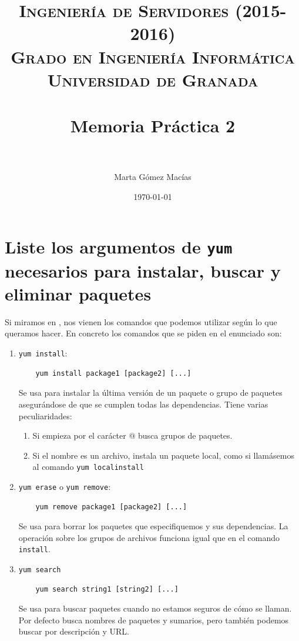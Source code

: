 \documentclass[10pt,a4paper,spanish]{article}
\title{
\normalfont \normalsize 
\textsc{{\bf Ingeniería de Servidores (2015-2016)} \\ Grado en Ingeniería Informática \\ Universidad de Granada} \\ [25pt] %
\horrule{0.5pt} \\[0.4cm] %
\huge Memoria Práctica 2 \\ %
\horrule{2pt} \\[0.5cm] %
}
\author{Marta Gómez Macías} %
\date{\normalsize\today} %
\numberwithin{equation}{section} %
\numberwithin{figure}{section} %
\numberwithin{table}{section} %
\begin{document}
\renewcommand{\listtablename}{Índice de tablas}
\renewcommand{\tablename}{Tabla} 

\maketitle %

\newpage %

\tableofcontents %

\listoffigures


\newpage

\section{Liste los argumentos de \texttt{yum} necesarios para instalar, buscar y eliminar paquetes}
Si miramos en \cite{manyum}, nos vienen los comandos que podemos utilizar según lo que queramos hacer. En concreto los comandos que se piden en el enunciado son:
\begin{enumerate}[---]
    \item \texttt{yum install}:
    \begin{verbatim}
    yum install package1 [package2] [...]
    \end{verbatim}

    Se usa para instalar la última versión de un paquete o grupo de paquetes asegurándose de que se cumplen todas las dependencias. Tiene varias peculiaridades:
    \begin{enumerate}[$\bullet$]
        \item Si empieza por el carácter $@$ busca grupos de paquetes.
        \item Si el nombre es un archivo, instala un paquete local, como si llamásemos al comando \texttt{yum localinstall}
    \end{enumerate}

    \item \texttt{yum erase} o \texttt{yum remove}:
    \begin{verbatim}
    yum remove package1 [package2] [...]
    \end{verbatim}

    Se usa para borrar los paquetes que especifiquemos y sus dependencias. La operación sobre los grupos de archivos funciona igual que en el comando \texttt{install}.

    \item \texttt{yum search}
    \begin{verbatim}
    yum search string1 [string2] [...]
    \end{verbatim}

    Se usa para buscar paquetes cuando no estamos seguros de cómo se llaman. Por defecto busca nombres de paquetes y sumarios, pero también podemos buscar por descripción y URL.
\end{enumerate}
\end{document}
